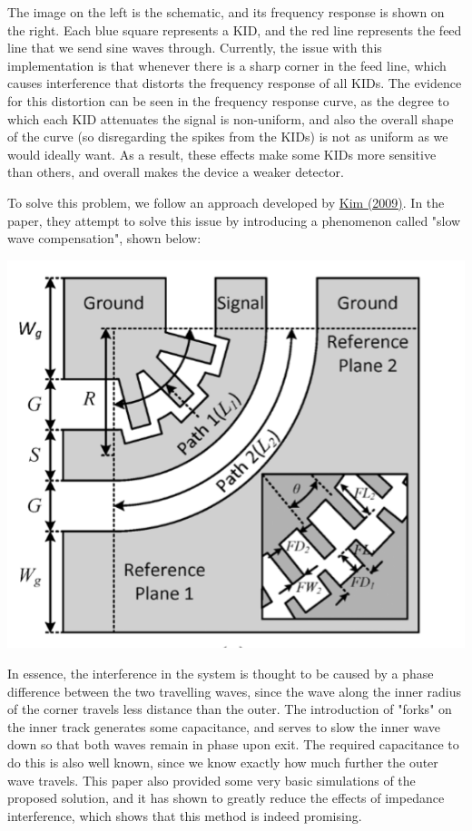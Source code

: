 \documentclass[10pt]{article}
\begin{document}
	The image on the left is the schematic, and its frequency response is shown on the right. 
	Each blue square represents a KID, and the red line represents the feed line
	that we send sine waves through. Currently, the issue with this implementation 
	is that whenever there is a sharp corner in the feed line, which causes interference 
	that distorts the frequency response of all KIDs. The evidence for this 
	distortion can be seen in the frequency response curve, as the degree 
	to which each KID attenuates the signal is non-uniform, and also the overall 
	shape of the curve (so disregarding the spikes from the KIDs) is not as uniform 
	as we would ideally want. As a result, these effects make some KIDs more 
	sensitive than others, and overall makes the device a weaker detector.  

	To solve this problem, we follow an approach developed by \href{https://ieeexplore.ieee.org/document/4752856}
	{Kim (2009)}. In the paper, they attempt to solve this issue by introducing
	a phenomenon called "slow wave compensation", shown below:

	\begin{center}
		\includegraphics[scale=0.6]{slow_wave.png}
	\end{center}

	In essence, the interference in the system is thought to be caused by a phase 
	difference between the two travelling waves, since the wave along the inner 
	radius of the corner travels less distance than the outer. The introduction 
	of "forks" on the inner track generates some capacitance, and serves to 
	slow the inner wave down so that both waves remain in phase upon exit. The required 
	capacitance to do this is also well known, since we know exactly how much further 
	the outer wave travels. 
	This paper also provided some very basic simulations of the proposed solution, and 
	it has shown to greatly reduce the effects of impedance interference, which shows 
	that this method is indeed promising. 
\end{document}
